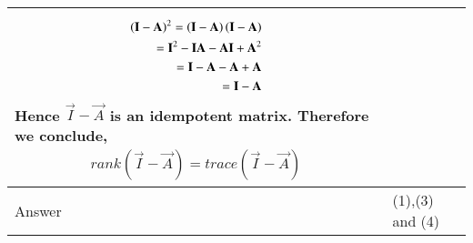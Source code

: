 \begin{table*}[!ht]
\begin{tabular}{|m{2.0in}|m{5.0in}|}
\begin{align}
	\left(\mathbf{I}-\mathbf{A}\right)^2 = \left(\mathbf{I}-\mathbf{A}\right)\left(\mathbf{I}-\mathbf{A}\right)\\
	= \mathbf{I}^2-\mathbf{IA}-\mathbf{AI}+\mathbf{A}^2 \\
	= \mathbf{I}-\mathbf{A}-\mathbf{A}+\mathbf{A} \\
	= \mathbf{I}-\mathbf{A}
\end{align}
Hence $\vec{I}-\vec{A}$ is an idempotent matrix. Therefore we conclude,
\begin{align}
        rank(\vec{I}-\vec{A})=trace(\vec{I}-\vec{A})
\end{align} \\ \hline
		Answer& (1),(3) and (4) \\ \hline
        \end{tabular}
        \caption{} \label{eq:solutions/2017/june/73/1}
\end{table*}
